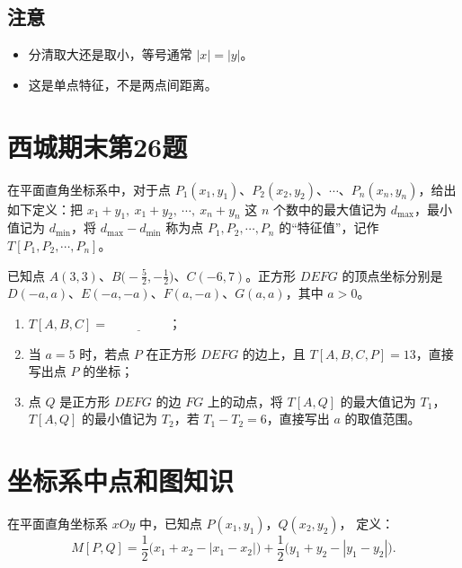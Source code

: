 \subsection*{注意}

\begin{itemize}
    \item 分清取大还是取小，等号通常 \(|x| = |y|\)。
    \item 这是单点特征，不是两点间距离。
\end{itemize}


\section{西城期末第26题}


在平面直角坐标系中，对于点 \(P_1(x_1, y_1)\)、\(P_2(x_2, y_2)\)、\(\cdots\)、\(P_n(x_n, y_n)\)，给出如下定义：把 \(x_1 + y_1,\ x_1 + y_2,\ \cdots,\ x_n + y_n\) 这 \(n\) 个数中的最大值记为 \(d_{\text{max}}\)，最小值记为 \(d_{\text{min}}\)，将 \(d_{\text{max}} - d_{\text{min}}\) 称为点 \(P_1, P_2, \cdots, P_n\) 的“特征值”，记作 \(T[P_1, P_2, \cdots, P_n]\)。

已知点 \(A(3, 3)\)、\(B\bigl(-\frac{5}{2}, -\frac{1}{2}\bigr)\)、\(C(-6, 7)\)。正方形 \(DEFG\) 的顶点坐标分别是 \(D(-a, a)\)、\(E(-a, -a)\)、\(F(a, -a)\)、\(G(a, a)\)，其中 \(a > 0\)。

\begin{enumerate}
    \item \(T[A, B, C] = \underline{\hspace{2cm}}\)；
    \vspace{3cm}
    \item 当 \(a = 5\) 时，若点 \(P\) 在正方形 \(DEFG\) 的边上，且 \(T[A, B, C, P] = 13\)，直接写出点 \(P\) 的坐标；
    \vspace{4cm}
    \item 点 \(Q\) 是正方形 \(DEFG\) 的边 \(FG\) 上的动点，将 \(T[A, Q]\) 的最大值记为 \(T_1\)，\(T[A, Q]\) 的最小值记为 \(T_2\)，若 \(T_1 - T_2 = 6\)，直接写出 \(a\) 的取值范围。
    \vspace{5cm}
\end{enumerate}

\section{坐标系中点和图知识}

在平面直角坐标系 \(xOy\) 中，已知点 \(P(x_1, y_1)\)，\(Q(x_2, y_2)\)，  
定义：
\[
M[P, Q] = \frac{1}{2}\bigl(x_1 + x_2 - |x_1 - x_2|\bigr) + \frac{1}{2}\bigl(y_1 + y_2 - |y_1 - y_2|\bigr).
\]

